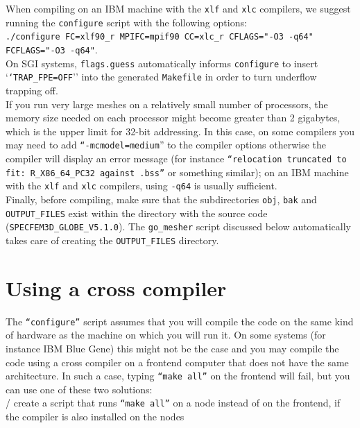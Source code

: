 \documentclass[oneside,english]{book}
\begin{document}
When compiling on an IBM machine with the \texttt{xlf} and \texttt{xlc} compilers, we suggest running the \texttt{configure} script
with the following options:\\

\noindent\texttt{./configure FC=xlf90\_r MPIFC=mpif90 CC=xlc\_r CFLAGS="-O3 -q64" FCFLAGS="-O3 -q64"}.\\

On SGI systems, \texttt{flags.guess} automatically informs \texttt{configure}
to insert `\texttt{`TRAP\_FPE=OFF}'' into the generated \texttt{Makefile}
in order to turn underflow trapping off.\\

If you run very large meshes on a relatively small number
of processors, the memory size needed on each processor might become
greater than 2 gigabytes, which is the upper limit for 32-bit addressing.
In this case, on some compilers you may need to add \texttt{``-mcmodel=medium}''
to the compiler options otherwise the compiler will display an error
message (for instance \texttt{``relocation truncated to fit: R\_X86\_64\_PC32 against .bss''} or something similar);
on an IBM machine with the \texttt{xlf} and \texttt{xlc} compilers, using \texttt{-q64} is usually sufficient.\\

Finally, before compiling, make sure that the subdirectories \texttt{obj},
\texttt{bak} and \texttt{OUTPUT\_FILES} exist within the directory
with the source code (\texttt{SPECFEM3D\_GLOBE\_V5.1.0}). The \texttt{go\_mesher}
script discussed below automatically takes care of creating the \texttt{OUTPUT\_FILES}
directory.

\section{Using a cross compiler}

The \texttt{``configure''} script assumes that you will compile the code on the same kind of hardware
as the machine on which you will run it. On some systems (for instance IBM Blue Gene) this might not be the case
and you may compile the code using a cross compiler on a frontend computer that does not have the same
architecture. In such a case, typing \texttt{``make all''} on the frontend will fail, but you can use one of these two solutions: \\

/ create a script that runs \texttt{``make all''} on a node instead of on the frontend, if the compiler is also installed on the nodes \\
\end{document}
